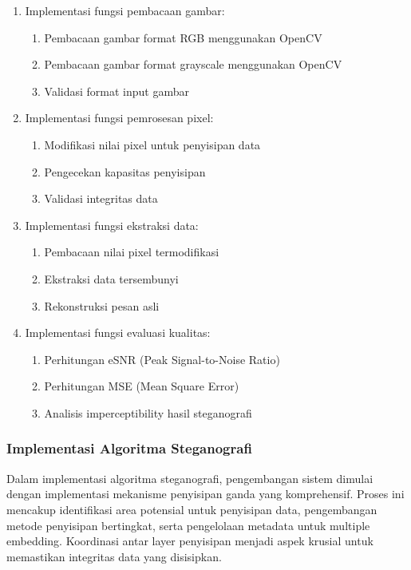 \documentclass{ittelkom}
\begin{document}
\begin{enumerate}
    \item Implementasi fungsi pembacaan gambar:
          \begin{enumerate}
              \item Pembacaan gambar format RGB menggunakan OpenCV
              \item Pembacaan gambar format grayscale menggunakan OpenCV
              \item Validasi format input gambar
          \end{enumerate}

    \item Implementasi fungsi pemrosesan pixel:
          \begin{enumerate}
              \item Modifikasi nilai pixel untuk penyisipan data
              \item Pengecekan kapasitas penyisipan
              \item Validasi integritas data
          \end{enumerate}

    \item Implementasi fungsi ekstraksi data:
          \begin{enumerate}
              \item Pembacaan nilai pixel termodifikasi
              \item Ekstraksi data tersembunyi
              \item Rekonstruksi pesan asli
          \end{enumerate}

    \item Implementasi fungsi evaluasi kualitas:
          \begin{enumerate}
              \item Perhitungan eSNR (Peak Signal-to-Noise Ratio)
              \item Perhitungan MSE (Mean Square Error)
              \item Analisis imperceptibility hasil steganografi
          \end{enumerate}
\end{enumerate}

\subsubsection{Implementasi Algoritma Steganografi}

Dalam implementasi algoritma steganografi, pengembangan sistem dimulai dengan
implementasi mekanisme penyisipan ganda yang komprehensif. Proses ini mencakup
identifikasi area potensial untuk penyisipan data, pengembangan metode
penyisipan bertingkat, serta pengelolaan metadata untuk multiple embedding.
Koordinasi antar layer penyisipan menjadi aspek krusial untuk memastikan
integritas data yang disisipkan.
\end{document}
